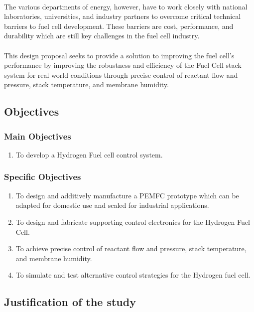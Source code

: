 \paragraph{}The various departments of energy, however,  have to work closely with national laboratories, universities, and industry partners to overcome critical technical barriers to fuel cell development. These barriers are cost, performance, and durability which are still key challenges in the fuel cell industry. 
\paragraph{}This design proposal seeks to provide a solution to improving the fuel cell’s performance by improving the robustness and efficiency of the Fuel Cell stack system for real world conditions through precise control of reactant flow and pressure, stack temperature, and membrane humidity\cite{stefanopoulou_mechatronics_nodate}.
\subsection{Objectives}
\subsubsection{Main Objectives}
\begin{enumerate}
\item To develop a Hydrogen Fuel cell control system.
\end{enumerate}
\subsubsection{Specific Objectives}
\begin{enumerate}
\item To design and additively manufacture a PEMFC prototype which can be adapted for domestic use and scaled for industrial applications.
\item To design and fabricate supporting control electronics for the Hydrogen Fuel Cell.
\item To achieve precise control of reactant flow and pressure, stack temperature, and membrane humidity.
\item To simulate and test alternative control strategies for the Hydrogen fuel cell. 
\end{enumerate}
\subsection{Justification of the study}
